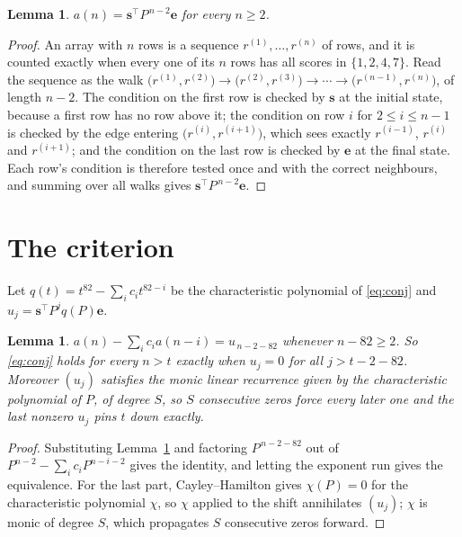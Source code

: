 \documentclass[11pt,a4paper]{article}
\theoremstyle{plain}
\newtheorem{lemma}[theorem]{Lemma}
\theoremstyle{definition}
\begin{document}
\begin{lemma}\label{lem:walk}
$a(n)=\mathbf{s}^{\!\top}P^{\,n-2}\mathbf{e}$ for every $n\ge2$.
\end{lemma}

\begin{proof}
An array with $n$ rows is a sequence $r^{(1)},\dots,r^{(n)}$ of rows, and it is counted
exactly when every one of its $n$ rows has all scores in $\{1,2,4,7\}$. Read the sequence as the
walk $\bigl(r^{(1)},r^{(2)}\bigr)\to\bigl(r^{(2)},r^{(3)}\bigr)\to\cdots\to
\bigl(r^{(n-1)},r^{(n)}\bigr)$, of length $n-2$. The condition on the first row is
checked by $\mathbf{s}$ at the initial state, because a first row has no row above it; the
condition on row $i$ for $2\le i\le n-1$ is checked by the edge entering
$\bigl(r^{(i)},r^{(i+1)}\bigr)$, which sees exactly $r^{(i-1)}$, $r^{(i)}$ and
$r^{(i+1)}$; and the condition on the last row is checked by $\mathbf{e}$ at the final
state. Each row's condition is therefore tested once and with the correct neighbours, and
summing over all walks gives $\mathbf{s}^{\!\top}P^{\,n-2}\mathbf{e}$.
\end{proof}

\section{The criterion}

Let $q(t)=t^{82}-\sum_i c_i t^{82-i}$ be the characteristic polynomial of
\eqref{eq:conj} and $u_j=\mathbf{s}^{\!\top}P^{j}q(P)\mathbf{e}$.

\begin{lemma}\label{lem:crit}
$a(n)-\sum_i c_i a(n-i)=u_{\,n-2-82}$ whenever $n-82\ge2$. So \eqref{eq:conj}
holds for every $n>t$ exactly when $u_j=0$ for all $j>t-2-82$. Moreover $(u_j)$
satisfies the monic linear recurrence given by the characteristic polynomial of $P$, of
degree $S$, so $S$ consecutive zeros force every later one and the last nonzero $u_j$ pins
$t$ down exactly.
\end{lemma}

\begin{proof}
Substituting Lemma~\ref{lem:walk} and factoring $P^{\,n-2-82}$ out of
$P^{n-2}-\sum_i c_i P^{n-i-2}$ gives the identity, and letting the exponent run gives the
equivalence. For the last part, Cayley--Hamilton gives $\chi(P)=0$ for the characteristic
polynomial $\chi$, so $\chi$ applied to the shift annihilates $(u_j)$; $\chi$ is monic of
degree $S$, which propagates $S$ consecutive zeros forward.
\end{proof}
\end{document}

